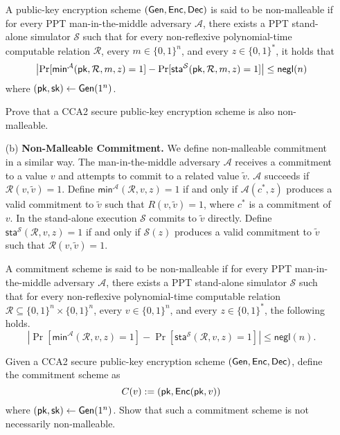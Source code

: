 \begin{exercise}
\begin{enumerate}
\begin{definition}
A public-key encryption scheme $(\mathsf{Gen}, \mathsf{Enc},\mathsf{Dec})$ is said to be non-malleable if for every PPT man-in-the-middle adversary $\mathcal{A}$, there exists a PPT stand-alone simulator $\mathcal{S}$ such that for every non-reflexive polynomial-time computable relation $\mathcal{R}$,  every $m\in \{0,1\}^n$, and every $z\in \{0,1\}^*$, it holds that
\[\left|\Pr[\mathsf{min}^{\mathcal{A}} (\mathsf{pk}, \mathcal{R}, m, z)=1] - \Pr[\mathsf{sta}^{\mathcal{S}} (\mathsf{pk}, \mathcal{R}, m, z)=1]\right| \leq \mathsf{negl}(n)\]
where $(\mathsf{pk}, \mathsf{sk}) \gets \mathsf{Gen}(1^n)$.
\end{definition}
Prove that a CCA2 secure public-key encryption scheme is also non-malleable.\\



\item[(b)]
\textbf{Non-Malleable Commitment.}
We define non-malleable commitment in a similar way.
The man-in-the-middle adversary $\mathcal{A}$ receives a commitment to a value $v$ and attempts to commit to a related value $\tilde v$.
$\mathcal{A}$ succeeds if $\mathcal{R}(v, \tilde v)=1$. Define $\mathsf{min}^{\mathcal{A}}(\mathcal{R}, v,z)=1$ if and only if $\mathcal{A}(c^*, z)$ produces a valid commitment to $\tilde v$ such that $R(v, \tilde v) = 1$, where $c^*$ is a commitment of $v$.
In the stand-alone execution $\mathcal{S}$ commits to $\tilde v$ directly. Define $\mathsf{sta}^{\mathcal{S}}(\mathcal{R}, v, z) = 1$ if and only if $\mathcal{S}(z)$ produces a valid commitment to $\tilde v$ such that $\mathcal{R}(v, \tilde v) = 1$.


\begin{definition}
A commitment scheme is said to be non-malleable if for every PPT man-in-the-middle adversary $\mathcal{A}$, there exists a PPT stand-alone simulator $\mathcal{S}$ such that for every non-reflexive polynomial-time computable relation $\mathcal{R} \subseteq \{0,1\}^n \times \{0,1\}^n$,  every $v\in \{0,1\}^n$, and every $z\in \{0,1\}^*$, the following holds.
\[\left| \Pr[\mathsf{min}^{\mathcal{A}} (\mathcal{R}, v, z)=1] - \Pr[\mathsf{sta}^{\mathcal{S}} (\mathcal{R}, v, z)=1] \right| \leq \mathsf{negl}(n).\]
\end{definition}

Given a CCA2 secure public-key encryption scheme $(\mathsf{Gen}, \mathsf{Enc}, \mathsf{Dec})$, define the commitment scheme as 
\[C(v) := \left(\mathsf{pk}, \mathsf{Enc}(\mathsf{pk}, v)\right)\]
where $(\mathsf{pk}, \mathsf{sk})\gets \mathsf{Gen}(1^n)$.
Show that such a commitment scheme is not necessarily  non-malleable.

	
\end{enumerate}

\end{exercise}
